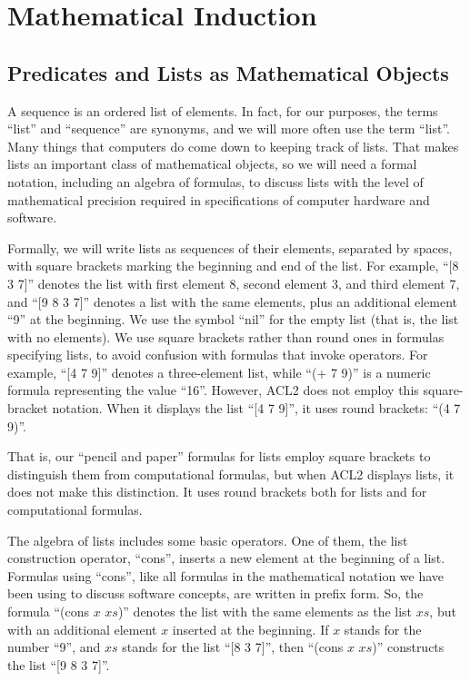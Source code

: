 \chapter{Mathematical Induction}

\section{Predicates and Lists as Mathematical Objects}
\label{sec:lists-as-obj}
A sequence is an ordered list of elements.
In fact, for our purposes, the terms ``list'' and ``sequence'' are synonyms,
and we will more often use the term ``list''.
Many things that computers do come down to keeping track of lists.
That makes lists an important class of mathematical objects,
so we will need a formal notation, including an algebra of formulas,
to discuss lists with the level of mathematical precision
required in specifications of computer hardware and software.

Formally, we will write lists as sequences of their elements, separated by spaces,
with square brackets marking the beginning and end of the list.
For example, ``[8 3 7]'' denotes the list with first element 8,
second element 3, and third element 7, and
``[9 8 3 7]'' denotes a list with the same elements,
plus an additional element ``9'' at the beginning.
\label{nil-def}
We use the symbol ``nil'' for the empty list (that is, the list with no elements).
\label{square-brackets}
We use square brackets rather than round ones in formulas
specifying lists, to avoid confusion with formulas that invoke operators.
For example, ``[4 7 9]'' denotes a three-element list,
while ``(+ 7 9)'' is a numeric formula representing the value ``16''.
However, ACL2 does not employ this square-bracket notation.
When it displays the list ``[4 7 9]'',
it uses round brackets: ``(4 7 9)''.

That is, our ``pencil and paper'' formulas for lists
employ square brackets to distinguish them from computational formulas,
but when ACL2 displays lists, it does not make this distinction.
It uses round brackets both for lists and for computational formulas.

The algebra of lists includes some basic operators.
One of them, the list construction operator, ``cons'',
inserts a new element at the beginning of a list.
Formulas using ``cons'', like all formulas in
the mathematical notation we have been using to discuss software concepts,
are written in prefix form.
So, the formula ``(cons $x$ $xs$)'' denotes the list
with the same elements as the list $xs$,
but with an additional element $x$ inserted at the beginning.
If $x$ stands for the number ``9'',
and $xs$ stands for the list ``[8 3 7]'',
then ``(cons $x$ $xs$)'' constructs the list ``[9 8 3 7]''.

